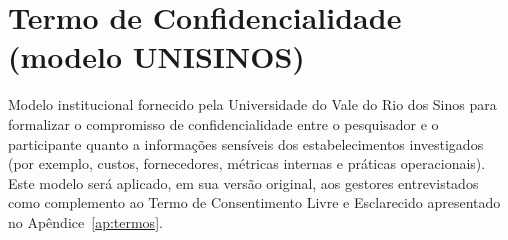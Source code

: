 \chapter{Termo de Confidencialidade (modelo UNISINOS)}
\label{an:confidencialidade}

Modelo institucional fornecido pela Universidade do Vale do Rio dos Sinos para formalizar o compromisso de confidencialidade entre o pesquisador e o participante quanto a informações sensíveis dos estabelecimentos investigados (por exemplo, custos, fornecedores, métricas internas e práticas operacionais). Este modelo será aplicado, em sua versão original, aos gestores entrevistados como complemento ao Termo de Consentimento Livre e Esclarecido apresentado no Apêndice~\ref{ap:termos}.


